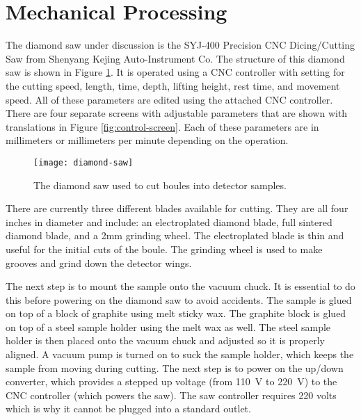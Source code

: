 \section{Mechanical Processing}
The diamond saw under discussion is the SYJ-400 Precision CNC Dicing/Cutting Saw from Shenyang Kejing Auto-Instrument Co.
The structure of this diamond saw is shown in Figure \ref{fig:diamondsaw}.
It is operated using a CNC controller with setting for the cutting speed, length, time, depth, lifting height, rest time, and movement speed.
All of these parameters are edited using the attached CNC controller. 
There are four separate screens with adjustable parameters that are shown with translations in Figure \ref{fig:control-screen}. 
Each of these parameters are in millimeters or millimeters per minute depending on the operation.
\begin{figure}[htpb]
\centering
\texttt{[image: diamond-saw]}
\caption{The diamond saw used to cut boules into detector samples.}
\label{fig:diamondsaw}
\end{figure}

There are currently three different blades available for cutting.
They are all four inches in diameter and include: an electroplated diamond blade, full sintered diamond blade, and a 2mm grinding wheel.
The electroplated blade is thin and useful for the initial cuts of the boule.
The grinding wheel is used to make grooves and grind down the detector wings.

The next step is to mount the sample onto the vacuum chuck.
It is essential to do this before powering on the diamond saw to avoid accidents.
The sample is glued on top of a block of graphite using melt sticky wax. The graphite block is glued on top of a steel sample holder using the melt wax as well.
The steel sample holder is then placed onto the vacuum chuck and adjusted so it is properly aligned.
A vacuum pump is turned on to suck the sample holder, which keeps the sample from moving during cutting.
The next step is to power on the up/down converter, which provides a stepped up voltage (from 110~V to 220~V) to the CNC controller (which powers the saw).
The saw controller requires 220 volts which is why it cannot be plugged into a standard outlet.

